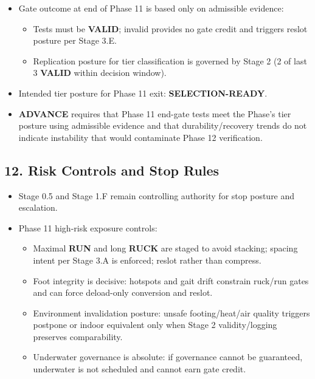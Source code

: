 \documentclass[10pt]{article}
\begin{document}
\begin{itemize}
\item Gate outcome at end of Phase 11 is based only on admissible evidence:
  \begin{itemize}
  \item Tests must be \textbf{VALID}; invalid provides no gate credit and triggers reslot posture per Stage 3.E.
  \item Replication posture for tier classification is governed by Stage 2 (2 of last 3 \textbf{VALID} within decision window).
  \end{itemize}
\item Intended tier posture for Phase 11 exit: \textbf{SELECTION-READY}.
\item \textbf{ADVANCE} requires that Phase 11 end-gate tests meet the Phase’s tier posture using admissible evidence and that durability/recovery trends do not indicate instability that would contaminate Phase 12 verification.
\end{itemize}

\subsection*{12. Risk Controls and Stop Rules}

\begin{itemize}
\item Stage 0.5 and Stage 1.F remain controlling authority for stop posture and escalation.
\item Phase 11 high-risk exposure controls:
  \begin{itemize}
  \item Maximal \textbf{RUN} and long \textbf{RUCK} are staged to avoid stacking; spacing intent per Stage 3.A is enforced; reslot rather than compress.
  \item Foot integrity is decisive: hotspots and gait drift constrain ruck/run gates and can force deload-only conversion and reslot.
  \item Environment invalidation posture: unsafe footing/heat/air quality triggers postpone or indoor equivalent only when Stage 2 validity/logging preserves comparability.
  \item Underwater governance is absolute: if governance cannot be guaranteed, underwater is not scheduled and cannot earn gate credit.
  \end{itemize}
\end{itemize}
\end{document}
